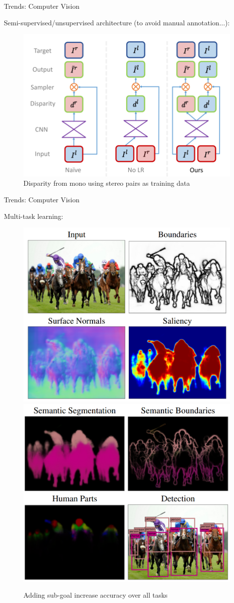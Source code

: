 \begin{frame}{Trends: Computer Vision}

	Semi-supervised/unsupervised architecture (to avoid manual annotation...):
	
	\begin{figure}
		\includegraphics[width=0.7\linewidth]{images/unsupervised.png}
		\caption{Disparity from mono using stereo pairs as training data~\cite{UNSUPERVISED}}
	\end{figure}

\end{frame}

\begin{frame}{Trends: Computer Vision}

	Multi-task learning:
	
	\begin{figure}
		\includegraphics[width=0.45\linewidth]{images/ubernet1.png}
		\includegraphics[width=0.44\linewidth]{images/ubernet2.png}
		\caption{Adding sub-goal increase accuracy over all tasks~\cite{UBERNET}}
	\end{figure}

	

\end{frame}


